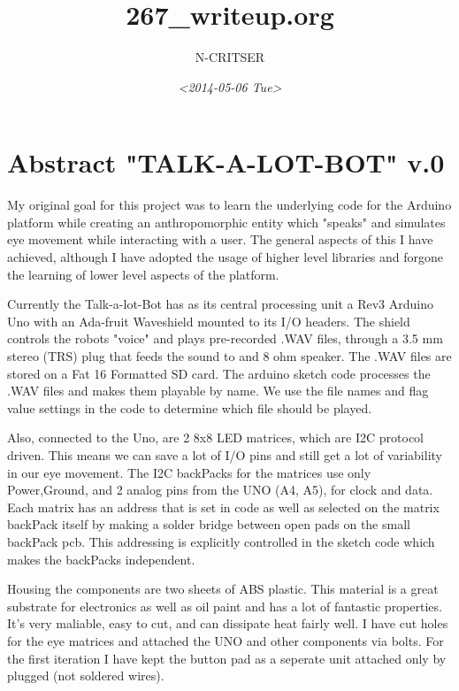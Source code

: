 \documentclass[a4paper,6pt]{article}
\author{N-CRITSER}
\date{\textit{<2014-05-06 Tue>}}
\title{267\_writeup.org}
\begin{document}
\maketitle



\section{Abstract "TALK-A-LOT-BOT" v.0}
\label{sec-1}
    My original goal for this project was to learn the underlying code for 
the Arduino platform while creating an anthropomorphic entity which "speaks"
and simulates eye movement while interacting with a user.  The general aspects
of this I have achieved, although I have adopted the usage of higher level 
libraries and forgone the learning of lower level aspects of the platform.  

    Currently the Talk-a-lot-Bot has as its central processing unit a Rev3 
Arduino Uno with an Ada-fruit Waveshield mounted to its I/O headers. The shield
controls the robots "voice" and plays pre-recorded .WAV files, through a 
3.5 mm stereo (TRS) plug that feeds the sound to and 8 ohm speaker.  The .WAV files  are stored on a 
Fat 16 Formatted SD card.  The arduino sketch code processes the .WAV files and makes them 
playable by name.  We use the file names and flag value settings in the code to determine 
which file should be played.  


    Also, connected to the Uno, are 2 8x8 LED matrices, which are I2C protocol driven. This means
we can save a lot of I/O pins and still get a lot of variability in our eye movement.  The I2C backPacks
for the matrices use only Power,Ground,  and 2 analog pins from the UNO (A4, A5), for clock and data.  Each 
matrix has an address that is set in code as well as selected on the matrix backPack itself by making a 
solder bridge between open pads on the small backPack pcb.  This addressing is explicitly controlled in 
the sketch code which makes the backPacks independent.  

    Housing the components are two sheets of ABS plastic.  This material is a great substrate 
for electronics as well as oil paint and has a lot of fantastic properties.  It's very maliable,
easy to cut, and can dissipate heat fairly well.  I have cut holes for the eye matrices and 
attached the UNO and other components via bolts.  For the first iteration I have kept the button pad
as a seperate unit attached only by plugged (not soldered wires).  
\end{document}
